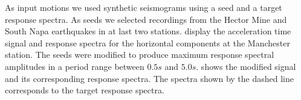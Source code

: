 \documentclass[11pt,letterpaper]{article}
\begin{document}
As input motions we used synthetic seismograms using a seed and a target response spectra. As seeds we selected recordings from the Hector Mine and South Napa earthquakes in at last two stations.  display the acceleration time signal and response spectra for the horizontal components at the Manchester station. The seeds were modified to produce maximum response spectral amplitudes in a period range between $0.5 s$ and $5.0 s$.  shows the modified signal and its corresponding response spectra. The spectra shown by the dashed line corresponds to the target response spectra.


\begin{figure}[H]
	\centering
    \\

\end{figure}
\end{document}
